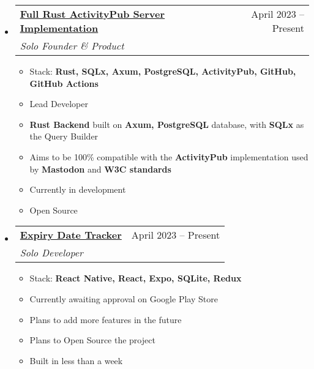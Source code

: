 \documentclass[a4paper,11pt]{article}
\makeatletter
\newcommand{\resumeItem}[1]{
  \item\large{#1}
}
\newcommand{\resumeItemListStart}{\begin{itemize}[rightmargin=0.11in]}
\newcommand{\resumeItemListEnd}{\end{itemize}}
\newcommand{\resumeQuadHeading}[4]{
  \item
  \begin{tabular*}{0.96\textwidth}[t]{l@{\extracolsep{\fill}}r}
    \textbf{#1} & #2 \\
    \textit{\large#3} & \textit{\large #4} \\
  \end{tabular*}
}
\newcommand{\resumeHeadingListStart}{
  \begin{itemize}[leftmargin=0.15in, label={}]
}
\newcommand{\resumeHeadingListEnd}{\end{itemize}}
\makeatother
\begin{document}
  \resumeHeadingListStart{}
  \resumeQuadHeading{\href{https://github.com/SushritPasupuleti/Rusty-Activity-Pub}{\uline{Full Rust ActivityPub Server Implementation
}}}{April 2023 -- Present}
  {Solo Founder \& Product}{}
      \resumeItemListStart{}
		\large{A full ActivityPub Server Implementation built in Rust, without any external dependencies. the ActivityPub protocol is a W3C standard, this allows for interoperability with other ActivityPub implementations such as Mastodon, Pleroma, Pixelfed, etc. This repo could be used to bootstrap a basic ActivityPub platform that could sync with the previously mention services as well.
}
		\resumeItem{Stack: \textbf{Rust,
			SQLx,
			Axum,
			PostgreSQL,
			ActivityPub,
			GitHub,
			GitHub Actions}}
		\resumeItem{Lead Developer}
		\resumeItem{\textbf{Rust Backend} built on \textbf{Axum, PostgreSQL} database, with \textbf{SQLx} as the Query Builder}
		\resumeItem{Aims to be 100\% compatible with the \textbf{ActivityPub} implementation used by \textbf{Mastodon} and \textbf{W3C standards}}
		\resumeItem{Currently in development}
		\resumeItem{Open Source}
      \resumeItemListEnd{}
  \resumeHeadingListEnd{}
  
  \resumeHeadingListStart{}
  \resumeQuadHeading{{\uline{Expiry Date Tracker
}}}{April 2023 -- Present}
   {Solo Developer}{}
      \resumeItemListStart{}
		\large{A simple Expiry Date tracker built on React Native, without too many external dependencies. This was built to help my mom keep track of the expiry dates of the products at home. It is clean and simple to use, and has a very minimalistic design.
}
		\resumeItem{Stack: \textbf{React Native,
			React,
			Expo,
			SQLite,
			Redux}}
		\resumeItem{Currently awaiting approval on Google Play Store}
		\resumeItem{Plans to add more features in the future}
		\resumeItem{Plans to Open Source the project}
		\resumeItem{Built in less than a week}
      \resumeItemListEnd{}
  \resumeHeadingListEnd{}
\end{document}

